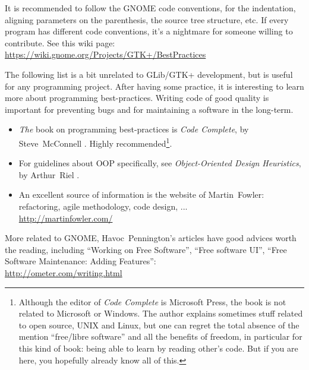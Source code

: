 It is recommended to follow the GNOME code conventions, for the indentation, aligning parameters on the parenthesis, the source tree structure, etc. If every program has different code conventions, it's a nightmare for someone willing to contribute. See this wiki page:\\
\url{https://wiki.gnome.org/Projects/GTK+/BestPractices}

The following list is a bit unrelated to GLib/GTK+ development, but is useful for any programming project. After having some practice, it is interesting to learn more about programming best-practices. Writing code of good quality is important for preventing bugs and for maintaining a software in the long-term.

\begin{itemize}
  \item \emph{The} book on programming best-practices is \emph{Code Complete}, by Steve~McConnell \cite{code-complete}. Highly recommended\footnote{Although the editor of \emph{Code Complete} is Microsoft Press, the book is not related to Microsoft or Windows. The author explains sometimes stuff related to open source, UNIX and Linux, but one can regret the total absence of the mention ``free/libre software'' and all the benefits of freedom, in particular for this kind of book: being able to learn by reading other's code. But if you are here, you hopefully already know all of this.}.

  \item For guidelines about OOP specifically, see \emph{Object-Oriented Design Heuristics}, by Arthur~Riel \cite{oop-book}.

  \item An excellent source of information is the website of Martin~Fowler: refactoring, agile methodology, code design, ...\\
  \url{http://martinfowler.com/}
\end{itemize}

More related to GNOME, Havoc~Pennington's articles have good advices worth the reading, including ``Working on Free Software'', ``Free software UI'', ``Free Software Maintenance: Adding Features'':\\
\url{http://ometer.com/writing.html}

